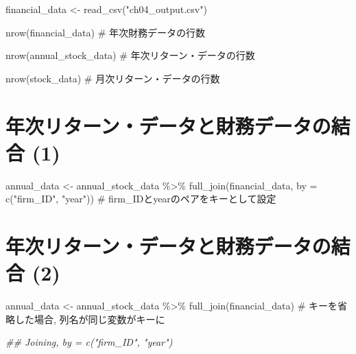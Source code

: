 \documentclass[
  letterpaper,
  DIV=11,
  numbers=noendperiod]{scrreprt}
\newenvironment{Shaded}{\begin{snugshade}}{\end{snugshade}}
\newcommand{\AttributeTok}[1]{\textcolor[rgb]{0.40,0.45,0.13}{#1}}
\newcommand{\CommentTok}[1]{\textcolor[rgb]{0.37,0.37,0.37}{#1}}
\newcommand{\DocumentationTok}[1]{\textcolor[rgb]{0.37,0.37,0.37}{\textit{#1}}}
\newcommand{\FunctionTok}[1]{\textcolor[rgb]{0.28,0.35,0.67}{#1}}
\newcommand{\NormalTok}[1]{\textcolor[rgb]{0.00,0.23,0.31}{#1}}
\newcommand{\OtherTok}[1]{\textcolor[rgb]{0.00,0.23,0.31}{#1}}
\newcommand{\SpecialCharTok}[1]{\textcolor[rgb]{0.37,0.37,0.37}{#1}}
\newcommand{\StringTok}[1]{\textcolor[rgb]{0.13,0.47,0.30}{#1}}
\begin{document}
\begin{Shaded}
\begin{Highlighting}[]
\NormalTok{financial\_data }\OtherTok{\textless{}{-}} \FunctionTok{read\_csv}\NormalTok{(}\StringTok{"ch04\_output.csv"}\NormalTok{)}

\FunctionTok{nrow}\NormalTok{(financial\_data) }\CommentTok{\# 年次財務データの行数}

\FunctionTok{nrow}\NormalTok{(annual\_stock\_data) }\CommentTok{\# 年次リターン・データの行数}

\FunctionTok{nrow}\NormalTok{(stock\_data) }\CommentTok{\# 月次リターン・データの行数}
\end{Highlighting}
\end{Shaded}

\section{年次リターン・データと財務データの結合
(1)}\label{ux5e74ux6b21ux30eaux30bfux30fcux30f3ux30c7ux30fcux30bfux3068ux8ca1ux52d9ux30c7ux30fcux30bfux306eux7d50ux5408-1}

\begin{Shaded}
\begin{Highlighting}[]
\NormalTok{annual\_data }\OtherTok{\textless{}{-}}\NormalTok{ annual\_stock\_data }\SpecialCharTok{\%\textgreater{}\%}
  \FunctionTok{full\_join}\NormalTok{(financial\_data, }\AttributeTok{by =} \FunctionTok{c}\NormalTok{(}\StringTok{"firm\_ID"}\NormalTok{, }\StringTok{"year"}\NormalTok{)) }\CommentTok{\# firm\_IDとyearのペアをキーとして設定}
\end{Highlighting}
\end{Shaded}

\section{年次リターン・データと財務データの結合
(2)}\label{ux5e74ux6b21ux30eaux30bfux30fcux30f3ux30c7ux30fcux30bfux3068ux8ca1ux52d9ux30c7ux30fcux30bfux306eux7d50ux5408-2}

\begin{Shaded}
\begin{Highlighting}[]
\NormalTok{annual\_data }\OtherTok{\textless{}{-}}\NormalTok{ annual\_stock\_data }\SpecialCharTok{\%\textgreater{}\%} 
  \FunctionTok{full\_join}\NormalTok{(financial\_data) }\CommentTok{\# キーを省略した場合, 列名が同じ変数がキーに}

\DocumentationTok{\#\# Joining, by = c("firm\_ID", "year")}
\end{Highlighting}
\end{Shaded}
\end{document}
